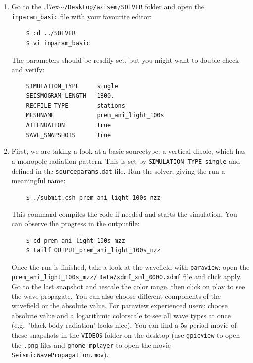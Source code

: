 \documentclass{article}
\newcommand{\ttilde}[0]{\raise.17ex\hbox{$\scriptstyle\sim$}}
\begin{document}
\begin{enumerate}
    \item Go to the \ttilde\verb|/Desktop/axisem/SOLVER| folder and open the
    \verb|inparam_basic| file with your favourite editor:
    \begin{verbatim}
    $ cd ../SOLVER
    $ vi inparam_basic
    \end{verbatim}
    The parameters should be readily set, but you might want to double check and verify:
    \begin{verbatim}
    SIMULATION_TYPE     single
    SEISMOGRAM_LENGTH   1800.
    RECFILE_TYPE        stations 
    MESHNAME            prem_ani_light_100s
    ATTENUATION         true 
    SAVE_SNAPSHOTS      true  
    \end{verbatim}
    \item First, we are taking a look at a basic sourcetype: a vertical dipole, which has
    a monopole radiation pattern. This is set by \verb|SIMULATION_TYPE single| and defined
    in the \verb|sourceparams.dat| file. Run the solver, giving the run a meaningful name:
    \begin{verbatim}
    $ ./submit.csh prem_ani_light_100s_mzz
    \end{verbatim}
    This command compiles the code if needed and starts the simulation. You can observe
    the progress in the outputfile:
    \begin{verbatim}
    $ cd prem_ani_light_100s_mzz
    $ tailf OUTPUT_prem_ani_light_100s_mzz
    \end{verbatim}
    Once the run is finished, take a look at the wavefield with \verb|paraview|: open
    the \verb|prem_ani_light_100s_mzz/| \verb|Data/xdmf_xml_0000.xdmf|
    file and click apply. Go to the last snapshot and rescale the color range,
    then click on play to see the wave propagate.  You can also choose
    different components of the wavefield or the absolute value.  For paraview
    experienced users: choose absolute value and a logarithmic colorscale to
    see all wave types at once (e.g.\ 'black body radiation' looks nice).  You
    can find a 5s period movie of these snapshots in the \verb|VIDEOS| folder on
    the desktop (use \verb|gpicview| to open the \verb|.png| files and
    \verb|gnome-mplayer| to open the movie \verb|SeismicWavePropagation.mov|).
   

\end{enumerate}
\end{document}

